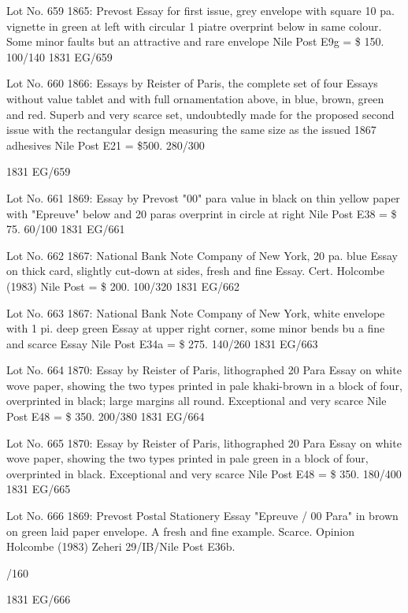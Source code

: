 \documentclass[justified]{tufte-book}
\begin{document}
%
{Lot No. 659
1865: Prevost Essay for first issue, grey envelope with square 10 pa. vignette in green at left with circular 1 piatre overprint below in same colour. Some minor faults but an attractive and rare envelope Nile Post E9g = \$ 150. 100/140
}%
{1831}%
{EG/659}%
{}%
{}
{}%
{}

%
{Lot No. 660
1866: Essays by Reister of Paris, the complete set of four Essays without value tablet and with full ornamentation above, in blue, brown, green and red. Superb and very scarce set, undoubtedly made for the proposed second issue with the rectangular design measuring the same size as the issued 1867 adhesives Nile Post E21 = \$500. 280/300

}%
{1831}%
{EG/659}%
{}%
{}
{}%
{}

%
{Lot No. 661
1869: Essay by Prevost "00" para value in black on thin yellow paper with "Epreuve" below and 20 paras overprint in circle at right Nile Post E38 = \$ 75. 60/100
}%
{1831}%
{EG/661}%
{}%
{}
{}%
{}

%
{Lot No. 662
1867: National Bank Note Company of New York, 20 pa. blue Essay on thick card, slightly cut-down at sides, fresh and fine Essay. Cert. Holcombe (1983) Nile Post = \$ 200. 100/320
}%
{1831}%
{EG/662}%
{}%
{}
{}%
{}

%
{Lot No. 663
1867: National Bank Note Company of New York, white envelope with 1 pi. deep green Essay at upper right corner, some minor bends bu a fine and scarce Essay Nile Post E34a = \$ 275. 140/260
}%
{1831}%
{EG/663}%
{}%
{}
{}%
{}

%
{Lot No. 664
1870: Essay by Reister of Paris, lithographed 20 Para Essay on white wove paper, showing the two types printed in pale khaki-brown in a block of four, overprinted in black; large margins all round. Exceptional and very scarce Nile Post E48 = \$ 350. 200/380
}%
{1831}%
{EG/664}%
{}%
{}
{}%
{}

%
{Lot No. 665
1870: Essay by Reister of Paris, lithographed 20 Para Essay on white wove paper, showing the two types printed in pale green in a block of four, overprinted in black. Exceptional and very scarce Nile Post E48 = \$ 350. 180/400
}%
{1831}%
{EG/665}%
{}%
{}
{}%
{}

%
{Lot No. 666
1869: Prevost Postal Stationery Essay "Epreuve / 00 Para" in brown on green laid paper envelope. A fresh and fine example. Scarce. Opinion Holcombe (1983) Zeheri 29/IB/Nile Post E36b. 

/160 
}%
{1831}%
{EG/666}%
{}%
{}
{}%
{}
\end{document}
